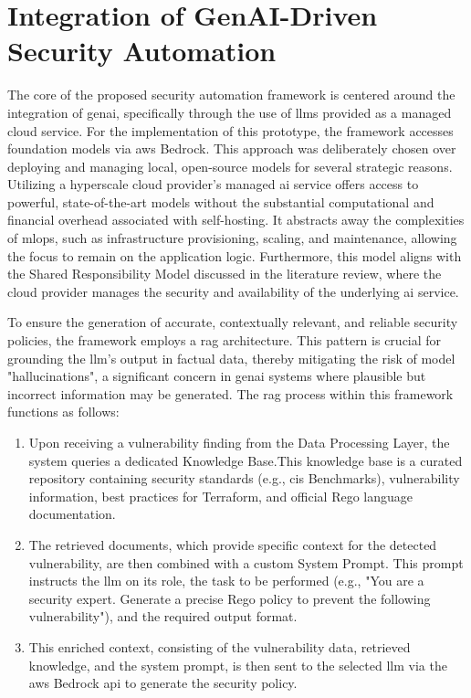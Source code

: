 

\section{Integration of GenAI-Driven Security Automation} %
\label{sub:Integration of GenAI-Driven Security Automation}

The core of the proposed security automation framework is centered around the integration of \gls{genai}, specifically through the use of \glspl{llm} provided as a managed cloud service. For the implementation of this prototype, the framework accesses foundation models via \gls{aws} Bedrock. This approach was deliberately chosen over deploying and managing local, open-source models for several strategic reasons. Utilizing a hyperscale cloud provider's managed \gls{ai} service offers access to powerful, state-of-the-art models without the substantial computational and financial overhead associated with self-hosting. It abstracts away the complexities of \gls{mlops}, such as infrastructure provisioning, scaling, and maintenance, allowing the focus to remain on the application logic. Furthermore, this model aligns with the Shared Responsibility Model discussed in the literature review, where the cloud provider manages the security and availability of the underlying \gls{ai} service.

To ensure the generation of accurate, contextually relevant, and reliable security policies, the framework employs a \gls{rag} architecture. This pattern is crucial for grounding the \gls{llm}'s output in factual data, thereby mitigating the risk of model "hallucinations", a significant concern in \gls{genai} systems where plausible but incorrect information may be generated. The \gls{rag} process within this framework functions as follows:

\begin{enumerate}
\item Upon receiving a vulnerability finding from the Data Processing Layer, the system queries a dedicated Knowledge Base.This knowledge base is a curated repository containing security standards (e.g., \gls{cis} Benchmarks), vulnerability information, best practices for Terraform, and official Rego language documentation.
\item The retrieved documents, which provide specific context for the detected vulnerability, are then combined with a custom System Prompt. This prompt instructs the \gls{llm} on its role, the task to be performed (e.g., "You are a security expert. Generate a precise Rego policy to prevent the following vulnerability"), and the required output format.
\item This enriched context, consisting of the vulnerability data, retrieved knowledge, and the system prompt, is then sent to the selected \gls{llm} via the \gls{aws} Bedrock \gls{api} to generate the security policy.
\end{enumerate}

